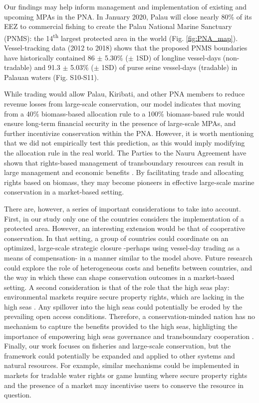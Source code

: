 \documentclass[12pt]{article}
\begin{document}
Our findings may help inform management and implementation of existing and upcoming MPAs in the PNA. In January 2020, Palau will close nearly 80\% of its EEZ to commercial fishing to create the Palau National Marine Sanctuary (PNMS): the 14\textsuperscript{th} largest protected area in the world (Fig. \ref{fig:PNA_map}). Vessel-tracking data (2012 to 2018) shows that the proposed PNMS boundaries have historically contained 86 $\pm$ 5.30\% ($\pm$ 1SD) of longline vessel-days (non-tradable) and 91.3 $\pm$ 5.03\% ($\pm$ 1SD) of purse seine vessel-days (tradable) in Palauan waters (Fig. S10-S11).

While trading would allow Palau, Kiribati, and other PNA members to reduce revenue losses from large-scale conservation, our model indicates that moving from a 40\% biomass-based allocation rule to a 100\% biomass-based rule would ensure long-term financial security in the presence of large-scale MPAs, and further incentivize conservation within the PNA. However, it is worth mentioning that we did not empirically test this prediction, as this would imply modifying the allocation rule in the real world. The Parties to the Nauru Agreement have shown that rights-based management of transboundary resources can result in large management and economic benefits \cite{havice_2013,aqorau_2018}. By facilitating trade and allocating rights based on biomass, they may become pioneers in effective large-scale marine conservation in a market-based setting.

There are, however, a series of important considerations to take into account. First, in our study only one of the countries considers the implementation of a protected area. However, an interesting extension would be that of cooperative conservation. In that setting, a group of countries could coordinate on an optimized, large-scale strategic closure -perhaps using vessel-day trading as a means of compensation- in a manner similar to the model above. Future research could explore the role of heterogeneous costs and benefits between countries, and the way in which these can shape conservation outcomes in a market-based setting. A second consideration is that of the role that the high seas play: environmental markets require secure property rights, which are lacking in the high seas \cite{crespo_2019}. Any spillover into the high seas could potentially be eroded by the prevailing open access conditions. Therefore, a conservation-minded nation has no mechanism to capture the benefits provided to the high seas, highligting the importance of empowering high seas governance and transboundary cooperation \cite{aqorau_2018,crespo_2019}. Finally, our work focuses on fisheries and large-scale conservation, but the framework could potentially be expanded and applied to other systems and natural resources. For example, similar mechanisms could be implemented in markets for tradable water rights \cite{rosegrant_1994} or game hunting \cite{hutton_2003} where secure property rights and the presence of a market may incentivise users to conserve the resource in question.
\end{document}
